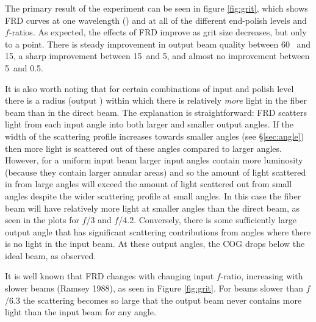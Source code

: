 The primary result of the experiment can be seen in figure
\ref{fig:grit}, which shows FRD curves at one wavelength (\filty) and at
all of the different end-polish levels and $f$-ratios. As expected,
the effects of FRD improve as grit size decreases, but only to a
point. There is steady improvement in output beam quality between 60
\mum\ and 15\mum, a sharp improvement between 15\mum\ and 5\mum,
and almost no improvement between 5\mum\ and 0.5\mum.

It is also worth noting that for certain combinations of input \fratio
and polish level there is a radius (output \fratio) within which there
is relatively \emph{more} light in the fiber beam than in the direct
beam.  The explanation is straightforward: FRD scatters light from
each input angle into both larger and smaller output angles. If the
width of the scattering profile increases towards smaller angles (see
\S\ref{sec:angle}) then more light is scattered out of these angles
compared to larger angles. However, for a uniform input beam
larger input angles contain more luminosity (because they contain
larger annular areas) and so the amount of light scattered in from large
angles will exceed the amount of light scattered out from small angles
despite the wider scattering profile at small angles. In this case the
fiber beam will have relatively more light at smaller angles than the
direct beam, as seen in the plots for $f$/3 and $f$/4.2. Conversely,
there is some sufficiently large output angle that has
significant scattering contributions from angles where there is no
light in the input beam. At these output angles, the COG drops below
the ideal beam, as observed.

It is well known that FRD changes with changing input $f$-ratio,
increasing with slower beams (Ramsey 1988)\cite{Ramsey88}, as seen in Figure
\ref{fig:grit}.  For beams slower than $f$/6.3 the scattering becomes so
large that the output beam never contains more light than the input
beam for any angle.

